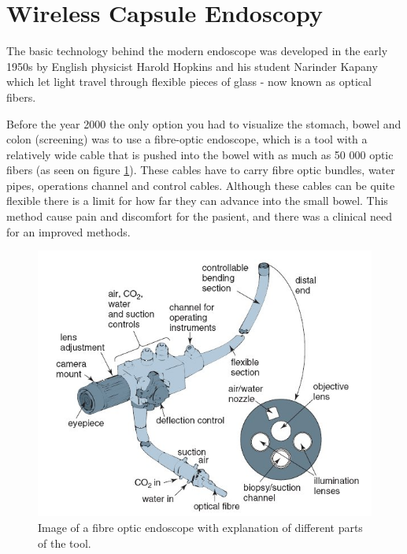 \documentclass[english, a4paper]{report}
\begin{document}
\section{Wireless Capsule Endoscopy}
The basic technology behind the modern endoscope was developed in the early 1950s by English physicist Harold Hopkins and his student Narinder Kapany which let light travel through flexible pieces of glass - now known as optical fibers. \cite{NewMethod54}

Before the year 2000 the only option you had to visualize the stomach, bowel and colon (screening) was to use a fibre-optic endoscope, which is a tool with a relatively wide cable that is pushed into the bowel with as much as 50 000 optic fibers (as seen on figure \ref{fig:fibre-optic-endoscopy}). These cables have to carry fibre optic bundles, water pipes, operations channel and control cables. Although these cables can be quite flexible there is a limit for how far they can advance into the small bowel. This method cause pain and discomfort for the pasient, and there was a clinical need for an improved methods.

\begin{figure}
\begin{center}
 \includegraphics[width=\textwidth]{fibre-optic-endoscopy.jpg}
 \caption{Image of a fibre optic endoscope with explanation of different parts of the tool. \cite{MedicalPhysics}}
 \label{fig:fibre-optic-endoscopy}
 \end{center}
\end{figure}
\end{document}
